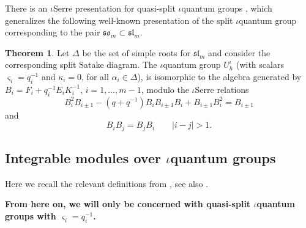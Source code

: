 \documentclass[10pt]{amsart}
\numberwithin{equation}{section}
\theoremstyle{definition}
\newtheorem{theorem}{Theorem}[section]
\newcommand{\slm}{\mathfrak{sl}_{m}}
\newcommand{\som}[1][m]{\mathfrak{so}_{#1}}
\begin{document}
There is an $\iota$Serre presentation for quasi-split $\iota$quantum groups \cite{MR4309551}, which generalizes the following well-known presentation of the split $\iota$quantum group corresponding to the pair $\som\subset\slm$. 

\begin{theorem}\label{thm:iSerre}
    Let $\Delta$ be the set of simple roots for $\slm$ and consider the corresponding split Satake diagram. The $\iota$quantum group $U_h^{\iota}$ (with scalars $\varsigma_i=q_{i}^{-1}$ and $\kappa_i=0$, for all $\alpha_i\in \Delta$), is isomorphic to the algebra generated by $B_i=F_i+q_i^{-1}E_iK_i^{-1}$, $i=1, \dots, m-1$, modulo the $\iota$Serre relations
    \begin{equation}\label{eq:iserre}
    B_i^2B_{i\pm 1} - (q+q^{-1})B_iB_{i\pm 1}B_i +B_{i\pm 1}B_i^2 = B_{i\pm 1}
    \end{equation}
    and 
    \begin{equation}
    B_iB_j=B_jB_i \qquad |i-j|> 1.
    \end{equation}
\end{theorem}

\subsection{Integrable modules over $\iota$quantum groups}

Here we recall the relevant definitions from \cite{WW25}, see also \cite[Section 3.3]{MR4533490}.

\textbf{From here on, we will only be concerned with quasi-split $\iota$quantum groups with $\varsigma_i=q_{i}^{-1}$.}
\end{document}

